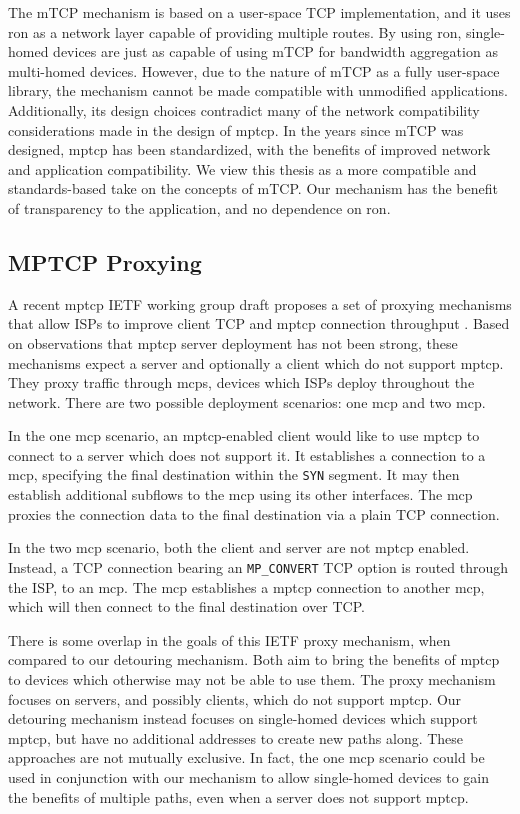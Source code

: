 \documentclass{cwru}
\begin{document}
The mTCP mechanism is based on a user-space TCP implementation, and it uses
\ac{ron} \cite{ron} as a network layer capable of providing multiple routes. By
using \ac{ron}, single-homed devices are just as capable of using mTCP for
bandwidth aggregation as multi-homed devices. However, due to the nature of mTCP
as a fully user-space library, the mechanism cannot be made compatible with
unmodified applications. Additionally, its design choices contradict many of the
network compatibility considerations made in the design of \ac{mptcp}. In the
years since mTCP was designed, \ac{mptcp} has been standardized, with the
benefits of improved network and application compatibility. We view this thesis
as a more compatible and standards-based take on the concepts of mTCP. Our
mechanism has the benefit of transparency to the application, and no dependence
on \ac{ron}.

\subsection{MPTCP Proxying}

A recent \ac{mptcp} IETF working group draft proposes a set of proxying
mechanisms that allow ISPs to improve client TCP and \ac{mptcp} connection
throughput \cite{boucadair-mptcp-plain-mode-10}. Based on observations that
\ac{mptcp} server deployment has not been strong, these mechanisms expect a
server and optionally a client which do not support \ac{mptcp}. They proxy
traffic through \acp{mcp}, devices which ISPs deploy throughout the network.
There are two possible deployment scenarios: one \ac{mcp} and two \ac{mcp}.

In the one \ac{mcp} scenario, an \ac{mptcp}-enabled client would like to use
\ac{mptcp} to connect to a server which does not support it. It establishes a
connection to a \ac{mcp}, specifying the final destination within the
\texttt{SYN} segment. It may then establish additional subflows to the \ac{mcp}
using its other interfaces. The \ac{mcp} proxies the connection data to the
final destination via a plain TCP connection.

In the two \ac{mcp} scenario, both the client and server are not \ac{mptcp}
enabled. Instead, a TCP connection bearing an \texttt{MP\_CONVERT} TCP option is
routed through the ISP, to an \ac{mcp}. The \ac{mcp} establishes a \ac{mptcp}
connection to another \ac{mcp}, which will then connect to the final destination
over TCP.

There is some overlap in the goals of this IETF proxy mechanism, when compared
to our detouring mechanism. Both aim to bring the benefits of \ac{mptcp} to
devices which otherwise may not be able to use them. The proxy mechanism focuses
on servers, and possibly clients, which do not support \ac{mptcp}. Our detouring
mechanism instead focuses on single-homed devices which support \ac{mptcp}, but
have no additional addresses to create new paths along. These approaches are not
mutually exclusive. In fact, the one \ac{mcp} scenario could be used in
conjunction with our mechanism to allow single-homed devices to gain the
benefits of multiple paths, even when a server does not support \ac{mptcp}.
\end{document}
